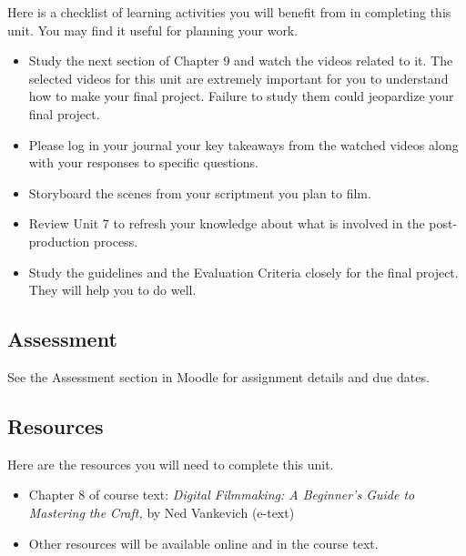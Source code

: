 \documentclass[
]{book}
\providecommand{\tightlist}{%
  \setlength{\itemsep}{0pt}\setlength{\parskip}{0pt}}
\begin{document}
\begin{reflect}
Here is a checklist of learning activities you will benefit from in completing this unit. You may find it useful for planning your work.

\begin{itemize}
\tightlist
\item
  Study the next section of Chapter 9 and watch the videos related to it. The selected videos for this unit are extremely important for you to understand how to make your final project. Failure to study them could jeopardize your final project.
\item
  Please log in your journal your key takeaways from the watched videos along with your responses to specific questions.
\item
  Storyboard the scenes from your scriptment you plan to film.
\item
  Review Unit 7 to refresh your knowledge about what is involved in the post-production process.
\item
  Study the guidelines and the Evaluation Criteria closely for the final project. They will help you to do well.
\end{itemize}
\end{reflect}

\hypertarget{assessment-16}{%
\subsection*{Assessment}\label{assessment-16}}

See the Assessment section in Moodle for assignment details and due dates.

\hypertarget{resources-8}{%
\subsection*{Resources}\label{resources-8}}

Here are the resources you will need to complete this unit.

\begin{itemize}
\tightlist
\item
  Chapter 8 of course text: \emph{Digital Filmmaking: A Beginner's Guide to Mastering the Craft,} by Ned Vankevich (e-text)
\item
  Other resources will be available online and in the course text.
\end{itemize}
\end{document}
